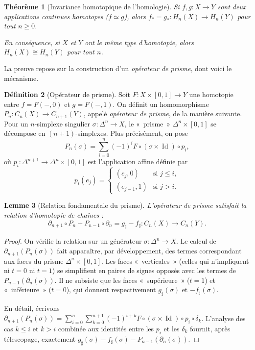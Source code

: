\documentclass[12pt,a4paper,openany]{book}
\theoremstyle{definition}
\newtheorem{definition}{Définition}[chapter]
\theoremstyle{plain}
\newtheorem{theoreme}[definition]{Théorème}
\newtheorem{lemme}[definition]{Lemme}
\theoremstyle{remark}
\DeclareMathOperator{\Id}{Id}
\begin{document}
\begin{theoreme}[Invariance homotopique de l'homologie]\label{thm:invariance-homotopique}
Si $f, g \colon X \to Y$ sont deux applications continues homotopes ($f \simeq g$), alors
$f_* = g_* \colon H_n(X) \to H_n(Y)$ pour tout $n \geq 0$.

En conséquence, si $X$ et $Y$ ont le même type d'homotopie, alors $H_n(X) \cong H_n(Y)$ pour tout $n$.
\end{theoreme}

La preuve repose sur la construction d'un \emph{opérateur de prisme}, dont voici le mécanisme.

\begin{definition}[Opérateur de prisme]\label{def:operateur-prisme}
Soit $F \colon X \times [0,1] \to Y$ une homotopie entre $f = F(-,0)$ et $g = F(-,1)$.
On définit un homomorphisme $P_n \colon C_n(X) \to C_{n+1}(Y)$, appelé \emph{opérateur de prisme},
de la manière suivante. Pour un $n$-simplexe singulier $\sigma \colon \Delta^n \to X$,
le «~prisme~» $\Delta^n \times [0,1]$ se décompose en $(n+1)$-simplexes. Plus précisément,
on pose
\[
  P_n(\sigma) = \sum_{i=0}^{n} (-1)^i F \circ (\sigma \times \Id) \circ p_i,
\]
où $p_i \colon \Delta^{n+1} \to \Delta^n \times [0,1]$ est l'application affine définie par
\[
  p_i(e_j) = \begin{cases}
    (e_j, 0) & \text{si } j \leq i, \\
    (e_{j-1}, 1) & \text{si } j > i.
  \end{cases}
\]
\end{definition}

\begin{lemme}[Relation fondamentale du prisme]\label{lem:relation-prisme}
L'opérateur de prisme satisfait la \emph{relation d'homotopie de chaînes} :
\[
  \partial_{n+1} \circ P_n + P_{n-1} \circ \partial_n = g_\sharp - f_\sharp \colon C_n(X) \to C_n(Y).
\]
\end{lemme}

\begin{proof}
On vérifie la relation sur un générateur $\sigma \colon \Delta^n \to X$. Le calcul de
$\partial_{n+1}(P_n(\sigma))$ fait apparaître, par développement, des termes correspondant aux
faces du prisme $\Delta^n \times [0,1]$. Les faces «~verticales~» (celles qui n'impliquent ni
$t=0$ ni $t=1$) se simplifient en paires de signes opposés avec les termes de $P_{n-1}(\partial_n(\sigma))$.
Il ne subsiste que les faces «~supérieure~» ($t=1$) et «~inférieure~» ($t=0$), qui donnent
respectivement $g_\sharp(\sigma)$ et $-f_\sharp(\sigma)$.

En détail, écrivons $\partial_{n+1}(P_n(\sigma)) = \sum_{i=0}^{n}\sum_{k=0}^{n+1} (-1)^{i+k} F \circ (\sigma \times \Id) \circ p_i \circ \delta_k$.
L'analyse des cas $k \leq i$ et $k > i$ combinée aux identités entre les $p_i$ et les $\delta_k$
fournit, après télescopage, exactement $g_\sharp(\sigma) - f_\sharp(\sigma) - P_{n-1}(\partial_n(\sigma))$.
\end{proof}
\end{document}
